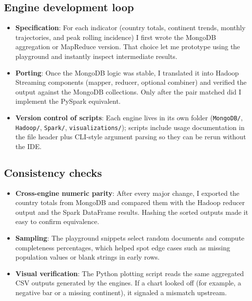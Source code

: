 \documentclass[12pt,a4paper]{article}
\begin{document}
\subsection{Engine development loop}
\begin{itemize}[leftmargin=1.2cm]
    \item \textbf{Specification}: For each indicator (country totals, continent trends, monthly trajectories, and peak rolling incidence) I first wrote the MongoDB aggregation or MapReduce version. That choice let me prototype using the playground and instantly inspect intermediate results.
    \item \textbf{Porting}: Once the MongoDB logic was stable, I translated it into Hadoop Streaming components (mapper, reducer, optional combiner) and verified the output against the MongoDB collections. Only after the pair matched did I implement the PySpark equivalent.
    \item \textbf{Version control of scripts}: Each engine lives in its own folder (\texttt{MongoDB/}, \texttt{Hadoop/}, \texttt{Spark/}, \texttt{visualizations/}); scripts include usage documentation in the file header plus CLI-style argument parsing so they can be rerun without the IDE.
\end{itemize}

\subsection{Consistency checks}
\begin{itemize}[leftmargin=1.2cm]
    \item \textbf{Cross-engine numeric parity}: After every major change, I exported the country totals from MongoDB and compared them with the Hadoop reducer output and the Spark DataFrame results. Hashing the sorted outputs made it easy to confirm equivalence.
    \item \textbf{Sampling}: The playground snippets select random documents and compute completeness percentages, which helped spot edge cases such as missing population values or blank strings in early rows.
    \item \textbf{Visual verification}: The Python plotting script reads the same aggregated CSV outputs generated by the engines. If a chart looked off (for example, a negative bar or a missing continent), it signaled a mismatch upstream.
\end{itemize}
\end{document}
